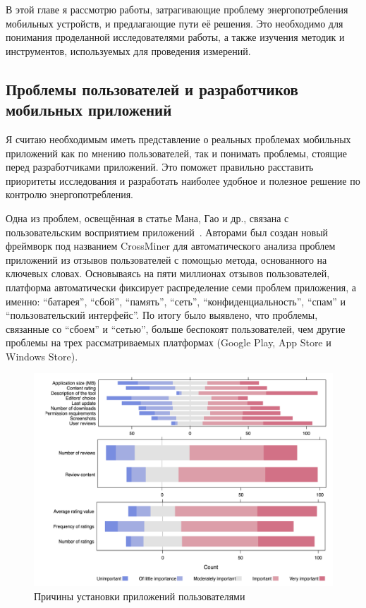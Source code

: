 \documentclass[a4paper,14pt]{extarticle} %
\begin{document}
	В этой главе я рассмотрю работы, затрагивающие проблему энергопотребления мобильных устройств, и предлагающие пути её решения. Это необходимо для понимания проделанной  исследователями работы, а также изучения методик и инструментов, используемых для проведения измерений.
	
	\subsection{Проблемы пользователей и разработчиков мобильных приложений}
	
	Я считаю необходимым иметь представление о реальных проблемах мобильных приложений как по мнению пользователей, так и понимать проблемы, стоящие перед разработчиками приложений. Это поможет правильно расставить приоритеты исследования и разработать наиболее удобное и полезное решение по контролю энергопотребления.
	
	Одна из проблем, освещённая в статье Мана, Гао и др., связана с пользовательским восприятием приложений~\parencite{man2016experience}. Авторами был создан новый фреймворк под названием CrossMiner для автоматического анализа проблем приложений из отзывов пользователей с помощью метода, основанного на ключевых словах. Основываясь на пяти миллионах отзывов пользователей, платформа автоматически фиксирует распределение семи проблем приложения, а именно: “батарея”, “сбой”, “память”, “сеть”, “конфиденциальность”, “спам” и “пользовательский интерфейс”. По итогу было выявлено, что проблемы, связанные со “сбоем” и “сетью”, больше беспокоят пользователей, чем другие проблемы на трех рассматриваемых платформах (Google Play, App Store и Windows Store).
	
	\begin{figure}[h]
		\includegraphics[width=\textwidth]{install_reasons}
		\caption{Причины установки приложений пользователями}
		\label{fig:install_reasons}
	\end{figure}
	
\end{document}
